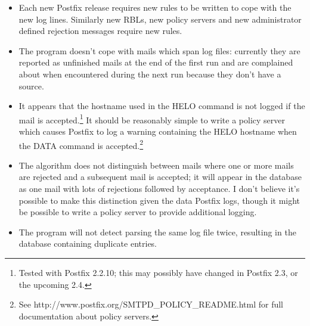 \documentclass[a4paper,12pt,draft]{article}
\begin{document}
\begin{itemize}

    \item Each new Postfix release requires new rules to be written to cope
        with the new log lines.  Similarly new RBLs, new policy servers and
        new administrator defined rejection messages require new rules.

    \item The program doesn't cope with mails which span log files:
        currently they are reported as unfinished mails at the end of the
        first run and are complained about when encountered during the next
        run because they don't have a source.

    \item It appears that the hostname used in the HELO command is not
        logged if the mail is accepted.\footnote{Tested with Postfix
        2.2.10; this may possibly have changed in Postfix 2.3, or the
        upcoming 2.4.}  It should be reasonably simple to write a policy
        server which causes Postfix to log a warning containing the HELO
        hostname when the DATA command is accepted.\footnote{See
        http://www.postfix.org/SMTPD\_POLICY\_README.html for full
        documentation about policy servers.}


    \item The algorithm does not distinguish between mails where one or
        more mails are rejected and a subsequent mail is accepted; it will
        appear in the database as one mail with lots of rejections followed
        by acceptance.  I don't believe it's possible to make this
        distinction given the data Postfix logs, though it might be
        possible to write a policy server to provide additional
        logging.

    \item The program will not detect parsing the same log file twice,
        resulting in the database containing duplicate entries.

\end{itemize}
\end{document}
